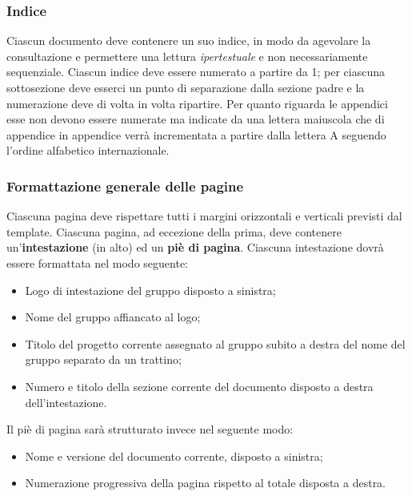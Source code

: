 	\subsubsection{Indice}
	
	Ciascun documento deve contenere un suo indice, in modo da agevolare la consultazione e permettere una lettura \textit{ipertestuale} e non necessariamente sequenziale. Ciascun indice deve essere numerato a partire da 1; per ciascuna sottosezione deve esserci un punto di separazione dalla sezione padre e la numerazione deve di volta in volta ripartire. Per quanto riguarda le appendici esse non devono essere numerate ma indicate da una lettera maiuscola che di appendice in appendice verrà incrementata a partire dalla lettera A seguendo l'ordine alfabetico internazionale.
	
	\subsubsection{Formattazione generale delle pagine}
	
	Ciascuna pagina deve rispettare tutti i margini orizzontali e verticali previsti dal template. Ciascuna pagina, ad eccezione della prima, deve contenere un'\textbf{intestazione} (in alto) ed un \textbf{piè di pagina}. Ciascuna intestazione dovrà essere formattata nel modo seguente:

	\begin{itemize}
	
		\item Logo di intestazione del gruppo disposto a sinistra;
		\item Nome del gruppo affiancato al logo;
		\item Titolo del progetto corrente assegnato al gruppo subito a destra del nome del gruppo separato da un trattino;
		\item Numero e titolo della sezione corrente del documento disposto a destra dell'intestazione.
	
	\end{itemize}
	
	Il piè di pagina sarà strutturato invece nel seguente modo:
	
	\begin{itemize}
	
		\item Nome e versione del documento corrente, disposto a sinistra;
		\item Numerazione progressiva della pagina rispetto al totale disposta a destra.
	
	\end{itemize}
	
